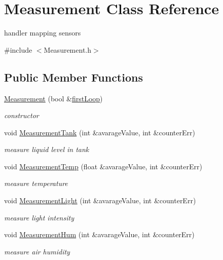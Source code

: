 \hypertarget{class_measurement}{}\section{Measurement Class Reference}
\label{class_measurement}


handler mapping sensors  




{\ttfamily \#include $<$Measurement.\+h$>$}

\subsection*{Public Member Functions}
\begin{DoxyCompactItemize}
\item 
\hyperlink{class_measurement_a29cccbc8dc4e3148a122b1246c67ac62}{Measurement} (bool \&\hyperlink{_arduino_8ino_ad777e59aed9e79afa28b5391460429d6}{first\+Loop})
\begin{DoxyCompactList}\small\item\em constructor \end{DoxyCompactList}\item 
void \hyperlink{class_measurement_aa53d67259769708cb8ee73cb3c81b8a3}{Measurement\+Tank} (int \&avarage\+Value, int \&counter\+Err)
\begin{DoxyCompactList}\small\item\em measure liquid level in tank \end{DoxyCompactList}\item 
void \hyperlink{class_measurement_a2d1cbf9b660ac8110d4b0cb9155f684e}{Measurement\+Temp} (float \&avarage\+Value, int \&counter\+Err)
\begin{DoxyCompactList}\small\item\em measure temperature \end{DoxyCompactList}\item 
void \hyperlink{class_measurement_aaf28bd2d4803cb8f4dd06eb84bf0294a}{Measurement\+Light} (int \&avarage\+Value, int \&counter\+Err)
\begin{DoxyCompactList}\small\item\em measure light intensity \end{DoxyCompactList}\item 
void \hyperlink{class_measurement_aeaa3e7b16fc4b23d4cbe5912205dc68e}{Measurement\+Hum} (int \&avarage\+Value, int \&counter\+Err)
\begin{DoxyCompactList}\small\item\em measure air humidity \end{DoxyCompactList}\end{DoxyCompactItemize}
